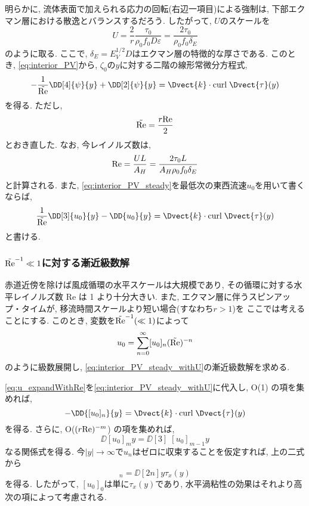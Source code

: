明らかに, 流体表面で加えられる応力の回転(右辺一項目)による強制は, 下部エクマン層における散逸とバランスするだろう. 
したがって, $U$のスケールを
\begin{equation}
  U = \dfrac{2}{r} \dfrac{\tau_0}{\rho_0 f_0 D \varepsilon}  = \dfrac{2 \tau_0}{\rho_0 f_0 \delta_E}
\end{equation}
のように取る. 
ここで, $\delta_E = E_V^{1/2} D$はエクマン層の特徴的な厚さである. 
このとき, \eqref{eq:interior_PV}から, $\zeta_0$の$y$に対する二階の線形常微分方程式,  
\begin{equation}
  - \dfrac{1}{\tilde{\rm Re}} \DD[4]{\psi}{y} + \DD[2]{\psi}{y} = \Dvect{k} \cdot {\rm curl} \; \Dvect{\tau}(y)
\label{eq:interior_PV_steady}
\end{equation}
を得る. 
ただし, 
\begin{equation}
  {\rm \tilde{Re}} = \dfrac{r{\rm Re}}{2}
\end{equation}
とおき直した. 
なお, 今レイノルズ数は, 
\begin{equation}
   {\rm Re} = \dfrac{UL}{A_H} = \dfrac{2 \tau_0 L}{A_H \rho_0 f_0 \delta_E}
\end{equation}
と計算される. 
また, \eqref{eq:interior_PV_steady}を最低次の東西流速$u_0$を用いて書くならば, 
\begin{equation}
   \dfrac{1}{{\rm \tilde{Re}}}\DD[3]{u_0}{y} - \DD{u_0}{y} 
  = \Dvect{k} \cdot {\rm curl} \; \Dvect{\tau}(y)
\label{eq:interior_PV_steady_withU}
\end{equation}
と書ける. 

\subsubsection*{$ \tilde{\rm Re}^{-1} \ll 1$に対する漸近級数解}
赤道近傍を除けば風成循環の水平スケールは大規模であり, 
その循環に対する水平レイノルズ数 Re は 1 より十分大きい. 
また, エクマン層に伴うスピンアップ・タイムが, 移流時間スケールより短い場合(すなわち$r > 1$)を
ここでは考えることにする. 
このとき, 変数を${\rm \tilde{Re}}^{-1} (\ll 1)$によって
\begin{equation}
   u_0 = \sum_{n=0}^\infty [u_0]_n ({\rm \tilde{Re}})^{-n}
\label{eq:u_expandWithRe}
\end{equation}
のように級数展開し, 
\eqref{eq:interior_PV_steady_withU}の漸近級数解を求める. 

\eqref{eq:u_expandWithRe}を\eqref{eq:interior_PV_steady_withU}に代入し, 
O(1) の項を集めれば, 
\begin{equation}
  - \DD{[u_0]_n}{y} 
  = \Dvect{k} \cdot {\rm curl} \; \Dvect{\tau}(y) 
 \end{equation}
を得る. 
さらに, O($(r {\rm Re})^{-m}$) の項を集めれば, 
\begin{equation}
  \DD{[u_0]_{m}}{y} = \DD[3]{\; [u_0]_{m-1}}{y}
\end{equation}
なる関係式を得る. 
今$|y| \to \infty$で$u_n$はゼロに収束することを仮定すれば, 
上の二式から
\begin{equation}
  [u_0]_n = \DD[2n]{}{y} \tau_x(y)
\end{equation}
を得る. 
したがって, $[u_0]_0$は単に$\tau_x(y)$であり, 
水平渦粘性の効果はそれより高次の項によって考慮される. 